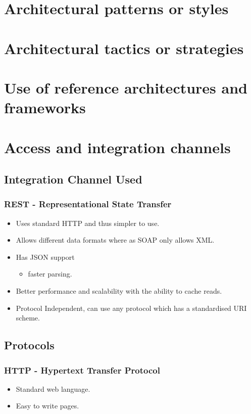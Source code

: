 \documentclass[12pt, oneside]{article}
\begin{document}
\section{Architectural patterns or styles}
\section{Architectural tactics or strategies}
\section{Use of reference architectures and frameworks}
\section{Access and integration channels}
	\subsection{Integration Channel Used}
		\subsubsection{REST - Representational State Transfer}
		\begin{itemize}
			\item Uses standard HTTP and thus simpler to use.
		 	\item Allows different data formats where as SOAP only allows XML.
			\item Has JSON support
				\begin{itemize}
					\item faster parsing.				
				\end{itemize}			 
			\item Better performance and scalability with the ability to cache reads.
			\item Protocol Independent, can use any protocol which has a standardised URI scheme.		
		\end{itemize}
	\subsection{Protocols}
		\subsubsection{HTTP - Hypertext Transfer Protocol}
			\begin{itemize}
				\item Standard web language.
				\item Easy to write pages.
			\end{itemize}
\end{document}
